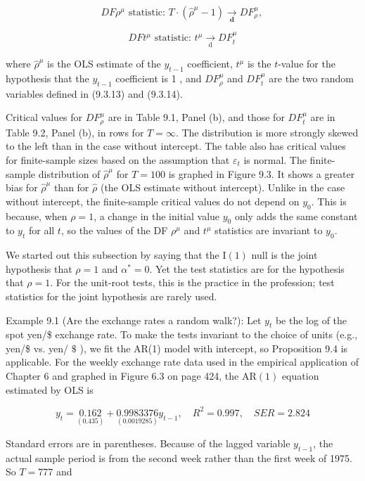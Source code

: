 \documentclass[10pt]{article}
\begin{document}
$$
D F \rho^{\mu} \text { statistic: } T \cdot\left(\hat{\rho}^{\mu}-1\right) \underset{\mathbf{d}}{\rightarrow} D F_{\rho}^{\mu} \text {, }
$$

$$
D F t^{\mu} \text { statistic: } t^{\mu} \underset{\mathrm{d}}{\rightarrow} D F_{t}^{\mu}
$$

where $\hat{\rho}^{\mu}$ is the OLS estimate of the $y_{t-1}$ coefficient, $t^{\mu}$ is the $t$-value for the hypothesis that the $y_{t-1}$ coefficient is 1 , and $D F_{\rho}^{\mu}$ and $D F_{t}^{\mu}$ are the two random variables defined in (9.3.13) and (9.3.14).

Critical values for $D F_{\rho}^{\mu}$ are in Table 9.1, Panel (b), and those for $D F_{t}^{\mu}$ are in Table 9.2, Panel (b), in rows for $T=\infty$. The distribution is more strongly skewed to the left than in the case without intercept. The table also has critical values for finite-sample sizes based on the assumption that $\varepsilon_{t}$ is normal. The finite-sample distribution of $\hat{\rho}^{\mu}$ for $T=100$ is graphed in Figure 9.3. It shows a greater bias for $\hat{\rho}^{\mu}$ than for $\hat{\rho}$ (the OLS estimate without intercept). Unlike in the case without intercept, the finite-sample critical values do not depend on $y_{0}$. This is because, when $\rho=1$, a change in the initial value $y_{0}$ only adds the same constant to $y_{t}$ for all $t$, so the values of the DF $\rho^{\mu}$ and $t^{\mu}$ statistics are invariant to $y_{0}$.

We started out this subsection by saying that the $\mathrm{I}(1)$ null is the joint hypothesis that $\rho=1$ and $\alpha^{*}=0$. Yet the test statistics are for the hypothesis that $\rho=1$. For the unit-root tests, this is the practice in the profession; test statistics for the joint hypothesis are rarely used.

Example 9.1 (Are the exchange rates a random walk?): Let $y_{t}$ be the log of the spot yen/\$ exchange rate. To make the tests invariant to the choice of units (e.g., yen/\$ vs. yen/ $\$$ ), we fit the AR(1) model with intercept, so Proposition 9.4 is applicable. For the weekly exchange rate data used in the empirical application of Chapter 6 and graphed in Figure 6.3 on page 424, the $\mathrm{AR}(1)$ equation estimated by OLS is

$$
y_{t}=\underset{(0.435)}{0.162}+\underset{(0.0019285)}{0.9983376} y_{t-1}, \quad R^{2}=0.997, \quad S E R=2.824
$$

Standard errors are in parentheses. Because of the lagged variable $y_{t-1}$, the actual sample period is from the second week rather than the first week of 1975. So $T=777$ and
\end{document}
